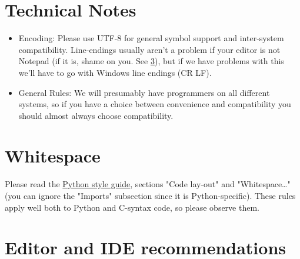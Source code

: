 \documentclass{article}
\begin{document}
\section{Technical Notes}
\begin{itemize}
\item Encoding: Please use UTF-8 for general symbol support and inter-system compatibility. Line-endings usually aren't a problem if your editor is not Notepad (if it is, shame on you. See \ref{sec:editors}), but if we have problems with this we'll have to go with Windows line endings (CR LF).
    \item General Rules: We will presumably have programmers on all different systems, so if you have a choice between convenience and compatibility you should almost always choose compatibility.

\end{itemize}

\section{Whitespace}
Please read the \hyperref[pyguide]{Python style guide}, sections "Code lay-out" and "Whitespace\ldots" (you can ignore the "Imports" subsection since it is Python-specific). These rules apply well both to Python and C-syntax code, so please observe them.

\appendix
\section{Editor and IDE recommendations}
\label{sec:editors}
\end{document}
